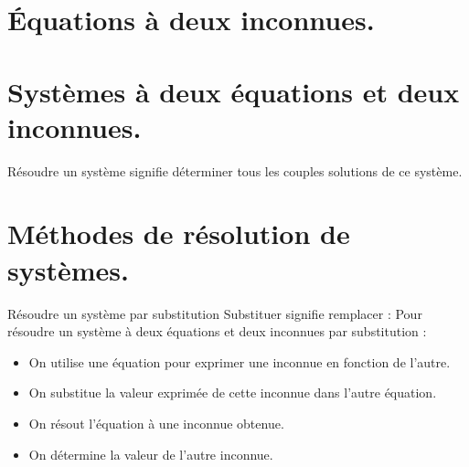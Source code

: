 \begin{pageCours} %


\section{Équations à deux inconnues.}



\section{Systèmes à deux équations et deux inconnues.}


\begin{Def}
Résoudre un système signifie déterminer tous les couples solutions de ce système.
\end{Def}

\section{Méthodes de résolution de systèmes.}

\begin{MtT}{Résoudre un système par substitution}
Substituer signifie remplacer : Pour résoudre un système à deux équations et deux inconnues par substitution :
\begin{itemize}
\item On utilise une équation pour exprimer une inconnue en fonction de l'autre.
\item On substitue la valeur exprimée de cette inconnue dans l'autre équation.
\item On résout l'équation à une inconnue obtenue.
\item On détermine la valeur de l'autre inconnue.
\end{itemize}
\end{MtT}


\end{pageCours}
